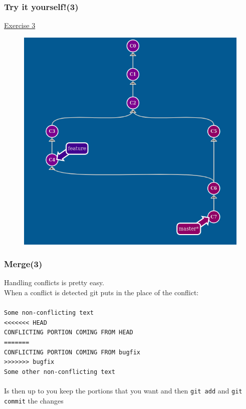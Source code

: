 \documentclass{beamer}
\begin{document}
\begin{frame}
    \frametitle{Try it yourself!(3)}
    \begin{center}
        \href{https://learngitbranching.js.org/?NODEMO\&command=git\%20commit;git\%20checkout\%20-b\%20feature;git\%20commit;git\%20commit;git\%20checkout\%20master;git\%20commit;git\%20checkout\%20feature}{Exercise 3}
    \end{center}
    \begin{figure}
        \includegraphics[scale=0.3]{imgs/ex3.png}
    \end{figure}
\end{frame}


\begin{frame}
    \frametitle{Merge(3)}
    Handling conflicts is pretty easy.\\
    When a conflict is detected git puts in the place of the conflict:
    \hfill \\
    \texttt{\\
    Some non-conflicting text \\
    <<<<<<< HEAD \\
    CONFLICTING PORTION COMING FROM HEAD \\
    ======= \\
    CONFLICTING PORTION COMING FROM bugfix \\
    >>>>>>> bugfix \\
    Some other non-conflicting text \\
    }
    \hfill \\
    Is then up to you keep the portions that you want and then \texttt{git add} and \texttt{git commit} the changes
\end{frame}
\end{document}
